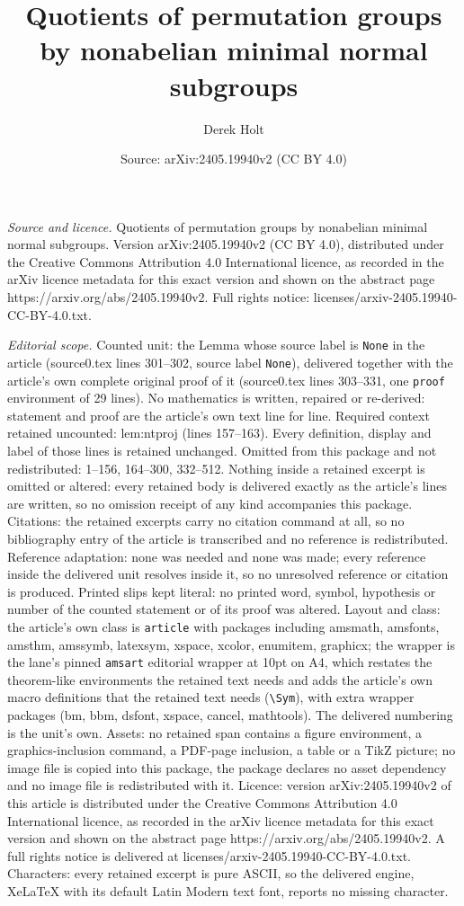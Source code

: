 \documentclass[10pt,a4paper]{amsart}
\title[Quotients of permutation groups by nonabelian minimal normal]{Quotients of permutation groups by nonabelian minimal normal subgroups}
\author{Derek Holt}
\date{Source: arXiv:2405.19940v2 (CC BY 4.0)}
\begin{document}
\maketitle

\noindent\emph{Source and licence.} Quotients of permutation groups by nonabelian minimal normal subgroups. Version arXiv:2405.19940v2 (CC BY 4.0), distributed under the Creative Commons Attribution 4.0 International licence, as recorded in the arXiv licence metadata for this exact version and shown on the abstract page https://arxiv.org/abs/2405.19940v2. Full rights notice: licenses/arxiv-2405.19940-CC-BY-4.0.txt.\par\smallskip

\noindent\textit{Editorial scope.} Counted unit: the Lemma whose source label is \texttt{None} in the article (source0.tex lines 301--302, source label \texttt{None}), delivered together with the article's own complete original proof of it (source0.tex lines 303--331, one \texttt{proof} environment of 29 lines). No mathematics is written, repaired or re-derived: statement and proof are the article's own text line for line. Required context retained uncounted: lem:ntproj (lines 157--163). Every definition, display and label of those lines is retained unchanged. Omitted from this package and not redistributed: 1--156, 164--300, 332--512. Nothing inside a retained excerpt is omitted or altered: every retained body is delivered exactly as the article's lines are written, so no omission receipt of any kind accompanies this package. Citations: the retained excerpts carry no citation command at all, so no bibliography entry of the article is transcribed and no reference is redistributed. Reference adaptation: none was needed and none was made; every reference inside the delivered unit resolves inside it, so no unresolved reference or citation is produced. Printed slips kept literal: no printed word, symbol, hypothesis or number of the counted statement or of its proof was altered. Layout and class: the article's own class is \texttt{article} with packages including amsmath, amsfonts, amsthm, amssymb, latexsym, xspace, xcolor, enumitem, graphicx; the wrapper is the lane's pinned \texttt{amsart} editorial wrapper at 10pt on A4, which restates the theorem-like environments the retained text needs and adds the article's own macro definitions that the retained text needs (\texttt{\textbackslash Sym}), with extra wrapper packages (bm, bbm, dsfont, xspace, cancel, mathtools). The delivered numbering is the unit's own. Assets: no retained span contains a figure environment, a graphics-inclusion command, a PDF-page inclusion, a table or a TikZ picture; no image file is copied into this package, the package declares no asset dependency and no image file is redistributed with it. Licence: version arXiv:2405.19940v2 of this article is distributed under the Creative Commons Attribution 4.0 International licence, as recorded in the arXiv licence metadata for this exact version and shown on the abstract page https://arxiv.org/abs/2405.19940v2. A full rights notice is delivered at licenses/arxiv-2405.19940-CC-BY-4.0.txt. Characters: every retained excerpt is pure ASCII, so the delivered engine, XeLaTeX with its default Latin Modern text font, reports no missing character.
\end{document}
